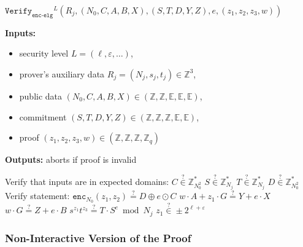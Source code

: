 \documentclass[11pt]{article}
\newenvironment{inlineAlgorithm}{}{}
\newcommand{\algoName}[1]{#1 \par}
\newcommand{\algoInputsList}[1]{
    {\small \bf Inputs:} 
        \begin{itemize}[noitemsep,topsep=0pt]
            #1
        \end{itemize}
}
\newcommand{\algoOutputs}[1]{
    {\small \bf Outputs:} #1 \par
}
\newcommand{\enc}{\ensuremath{\mathtt{enc}}}
\newcommand{\verify}[1]{\ensuremath{\mathtt{Verify}_{\mathtt{#1}}}}
\newcommand{\E}{\mathbb{E}}
\newcommand{\Z}{\mathbb{Z}}
\newcommand{\?}[1]{\stackrel{?}{#1}}
\begin{document}
\begin{description}
\item
\begin{inlineAlgorithm}
\algoName{$\verify{enc\mbox{-}elg}^L(R_j, (N_0, C, A, B, X), (S, T, D, Y, Z), e, (z_1, z_2, z_3, w))$}
\algoInputsList{
    \item security level $L = (\ell, \varepsilon, \dots)$,
    \item prover's auxiliary data $R_j = (N_j, s_j, t_j) \in \Z^3$,
    \item public data $(N_0, C, A, B, X) \in (\Z, \Z, \E, \E, \E)$,
    \item commitment $(S, T, D, Y, Z) \in (\Z, \Z, \Z, \E, \E)$,
    \item proof $(z_1, z_2, z_3, w) \in (\Z, \Z, \Z, \Z_q)$
}
\algoOutputs{aborts if proof is invalid}
\begin{algorithmic}[1]
\Statex Verify that inputs are in expected domains:
\State $C \? \in \Z^*_{N_0^2}$
\State $S \? \in \Z^*_{N_j}$
\State $T \? \in \Z^*_{N_j}$
\State $D \? \in \Z^*_{N_0^2}$
\Statex Verify statement:
\State $\enc_{N_0}(z_1, z_2) \? = D \oplus e \odot C$
\State $w \cdot A + z_1 \cdot G \? = Y + e \cdot X$
\State $w \cdot G \? = Z + e \cdot B$
\State $s^{z_1} t^{z_3} \? = T \cdot S^e \bmod N_j$
\State $z_1 \? \in \pm 2^{\ell + \varepsilon}$
\end{algorithmic}
\end{inlineAlgorithm}

\end{description}

\subsubsection{Non-Interactive Version of the Proof}
\end{document}

